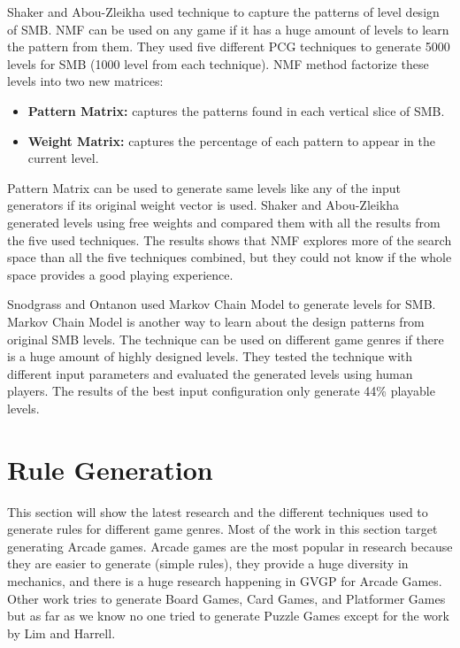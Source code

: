 Shaker and Abou-Zleikha\cite{nmfSuperMarioBros} used  technique to capture the patterns of level design of SMB. NMF can be used on any game if it has a huge amount of levels to learn the pattern from them. They used five different PCG techniques to generate 5000 levels for SMB (1000 level from each technique). NMF method factorize these levels into two new matrices:
\begin{itemize} \itemsep0pt \parskip0pt 
	\item \textbf{Pattern Matrix:} captures the patterns found in each vertical slice of SMB.
	\item \textbf{Weight Matrix:} captures the percentage of each pattern to appear in the current level.
\end{itemize}
Pattern Matrix can be used to generate same levels like any of the input generators if its original weight vector is used. Shaker and Abou-Zleikha generated levels using free weights and compared them with all the results from the five used techniques. The results shows that NMF explores more of the search space than all the five techniques combined, but they could not know if the whole space provides a good playing experience.\\\par

Snodgrass and Ontanon\cite{markovSuperMarioBros} used Markov Chain Model to generate levels for SMB. Markov Chain Model is another way to learn about the design patterns from original SMB levels. The technique can be used on different game genres if there is a huge amount of highly designed levels. They tested the technique with different input parameters and evaluated the generated levels using human players. The results of the best input configuration only generate 44\% playable levels.

\section{Rule Generation}
This section will show the latest research and the different techniques used to generate rules for different game genres. Most of the work in this section target generating Arcade games\cite{arcadeHillClimber, cookArcadeGames, romCheckFail, variationForever, gameOMatic}. Arcade games are the most popular in research because they are easier to generate (simple rules), they provide a huge diversity in mechanics, and there is a huge research happening in GVGP for Arcade Games\cite{gvgp}. Other work tries to generate Board Games\cite{evolveBrowne}, Card Games\cite{generationCardGames}, and Platformer Games\cite{mechanicMiner} but as far as we know no one tried to generate Puzzle Games except for the work by Lim and Harrell\cite{puzzleScriptGeneration}.

